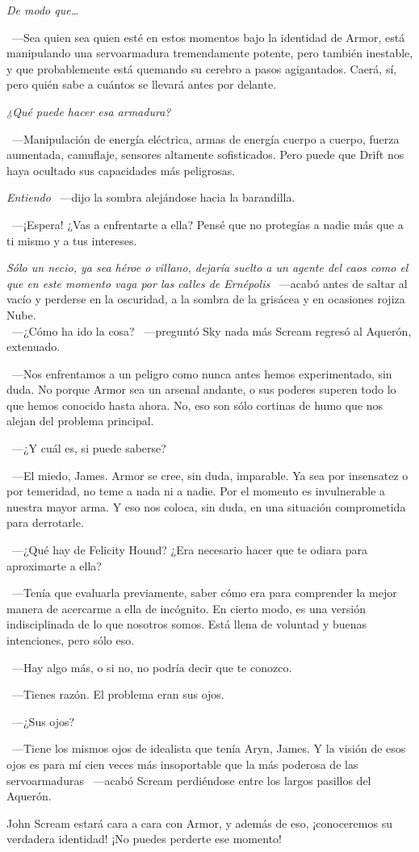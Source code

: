 \emph{De modo que\dots}

~---Sea quien sea quien esté en estos momentos bajo la identidad de Armor, está manipulando una servoarmadura tremendamente potente, pero también inestable, y que probablemente está quemando su cerebro a pasos agigantados. Caerá, sí, pero quién sabe a cuántos se llevará antes por delante.

\emph{¿Qué puede hacer esa armadura?}

~---Manipulación de energía eléctrica, armas de energía cuerpo a cuerpo, fuerza aumentada, camuflaje, sensores altamente sofisticados. Pero puede que Drift nos haya ocultado sus capacidades más peligrosas.

\emph{Entiendo} ~---dijo la sombra alejándose hacia la barandilla.

~---¡Espera! ¿Vas a enfrentarte a ella? Pensé que no protegías a nadie más que a ti mismo y a tus intereses.

\emph{Sólo un necio, ya sea héroe o villano, dejaría suelto a un agente del caos como el que en este momento vaga por las calles de Ernépolis} ~---acabó antes de saltar al vacío y perderse en la oscuridad, a la sombra de la grisácea y en ocasiones rojiza Nube.\\

\noindent{}~---¿Cómo ha ido la cosa? ~---preguntó Sky nada más Scream regresó al Aquerón, extenuado.

~---Nos enfrentamos a un peligro como nunca antes hemos experimentado, sin duda. No porque Armor sea un arsenal andante, o sus poderes superen todo lo que hemos conocido hasta ahora. No, eso son sólo cortinas de humo que nos alejan del problema principal.

~---¿Y cuál es, si puede saberse?

~---El miedo, James. Armor se cree, sin duda, imparable. Ya sea por insensatez o por temeridad, no teme a nada ni a nadie. Por el momento es invulnerable a nuestra mayor arma. Y eso nos coloca, sin duda, en una situación comprometida para derrotarle.

~---¿Qué hay de Felicity Hound? ¿Era necesario hacer que te odiara para aproximarte a ella?

~---Tenía que evaluarla previamente, saber cómo era para comprender la mejor manera de acercarme a ella de incógnito. En cierto modo, es una versión indisciplinada de lo que nosotros somos. Está llena de voluntad y buenas intenciones, pero sólo eso.

~---Hay algo más, o si no, no podría decir que te conozco.

~---Tienes razón. El problema eran sus ojos.

~---¿Sus ojos?

~---Tiene los mismos ojos de idealista que tenía Aryn, James. Y la visión de esos ojos es para mí cien veces más insoportable que la más poderosa de las servoarmaduras ~---acabó Scream perdiéndose entre los largos pasillos del Aquerón.

\begin{next}
    John Scream estará cara a cara con Armor, y además de eso, ¡conoceremos su verdadera identidad! ¡No puedes perderte ese momento!
\end{next}

\endinput
